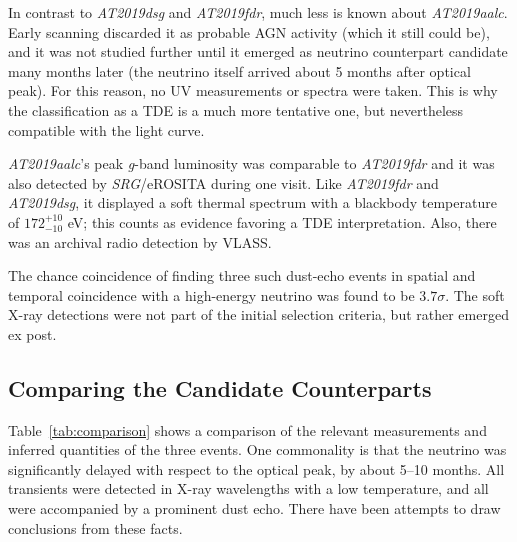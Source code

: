 In contrast to \textit{AT2019dsg} and \textit{AT2019fdr}, much less is known about \textit{AT2019aalc}. Early scanning discarded it as probable AGN activity (which it still could be), and it was not studied further until it emerged as neutrino counterpart candidate many months later (the neutrino itself arrived about 5 months after optical peak). For this reason, no UV measurements or spectra were taken. This is why the classification as a TDE is a much more tentative one, but nevertheless compatible with the light curve.

\textit{AT2019aalc}'s peak \textit{g}-band luminosity was comparable to \textit{AT2019fdr} and it was also detected by \textit{SRG}/eROSITA during one visit. Like \textit{AT2019fdr} and \textit{AT2019dsg}, it displayed a soft thermal spectrum with a blackbody temperature of $172^{+10}_{-10}$ eV; this counts as evidence favoring a TDE interpretation. Also, there was an archival radio detection by VLASS.

The chance coincidence of finding three such dust-echo events in spatial and temporal coincidence with a high-energy neutrino was found to be $3.7\sigma$. The soft X-ray detections were not part of the initial selection criteria, but rather emerged ex post.

\pagebreak

\subsection{Comparing the Candidate Counterparts}
Table~\ref{tab:comparison} shows a comparison of the relevant measurements and inferred quantities of the three events. One commonality is that the neutrino was significantly delayed with respect to the optical peak, by about 5--10 months. All transients were detected in X-ray wavelengths with a low temperature, and all were accompanied by a prominent dust echo. There have been attempts to draw conclusions from these facts.

